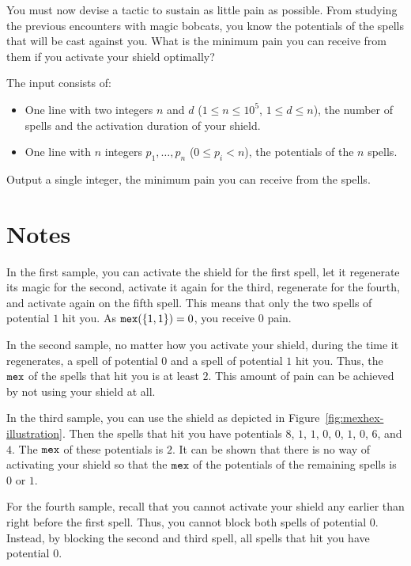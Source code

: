 You must now devise a tactic to sustain as little pain as possible.
From studying the previous encounters with magic bobcats, you know the potentials of the spells that will be cast against you.
What is the minimum pain you can receive from them if you activate your shield optimally?

\begin{Input}
	The input consists of:
	\begin{itemize}
		\item One line with two integers $n$ and $d$ ($1 \leq n \leq 10^5$, $1 \leq d \leq n$), the number of spells and the activation duration of your shield.
		\item One line with $n$ integers $p_1, \dots, p_n$ ($0 \leq p_i < n$), the potentials of the $n$ spells.
	\end{itemize}
\end{Input}

\begin{Output}
	Output a single integer, the minimum pain you can receive from the spells.
\end{Output}

\section*{Notes}

In the first sample, you can activate the shield for the first spell, let it regenerate its magic for the second, activate it again for the third, regenerate for the fourth, and activate again on the fifth spell.
This means that only the two spells of potential $1$ hit you.
As $\mathtt{mex}(\{1, 1\}) = 0$, you receive $0$ pain.

In the second sample, no matter how you activate your shield, during the time it regenerates, a spell of potential $0$ and a spell of potential $1$ hit you.
Thus, the $\mathtt{mex}$ of the spells that hit you is at least $2$.
This amount of pain can be achieved by not using your shield at all.

In the third sample, you can use the shield as depicted in Figure~\ref{fig:mexhex-illustration}.
Then the spells that hit you have potentials $8$, $1$, $1$, $0$, $0$, $1$, $0$, $6$, and $4$.
The $\mathtt{mex}$ of these potentials is $2$.
It can be shown that there is no way of activating your shield so that the $\mathtt{mex}$ of the potentials of the remaining spells is $0$ or $1$.

For the fourth sample, recall that you cannot activate your shield any earlier than right before the first spell.
Thus, you cannot block both spells of potential $0$.
Instead, by blocking the second and third spell, all spells that hit you have potential $0$.
